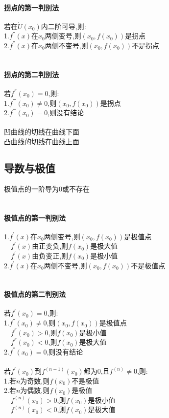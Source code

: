\documentclass{article}
\begin{document}
\begin{flushleft}
	\paragraph{拐点的第一判别法}
	若在$\mathring{U}(x_0)$内二阶可导,则:\\
	1.$f^{''}(x)$在$x_0$两侧变号,则$(x_0,f(x_0))$是拐点\\
	2.$f^{''}(x)$在$x_0$两侧不变号,则$(x_0,f(x_0))$不是拐点\\
	~\\
	\paragraph{拐点的第二判别法}
	若$f^{''}(x_0)=0$,则:\\
	1.$f^{'''}(x_0)\neq 0$,则$(x_0,f(x_0))$是拐点\\
	2.$f^{'''}(x_0)=0$,则没有结论\\
	~\\
	凹曲线的切线在曲线下面\\
	凸曲线的切线在曲线上面\\
	
	\subsection{导数与极值}
	
	极值点的一阶导为0或不存在\\
	~\\
	\paragraph{极值点的第一判别法}
	1.$f^{'}(x)$在$x_0$两侧变号,则$(x_0,f(x_0))$是极值点\\
	\ \ $f^{'}(x)$由正变负,则$f(x_0)$是极大值\\
	\ \ $f^{'}(x)$由负变正,则$f(x_0)$是极小值\\
	2.$f^{'}(x)$在$x_0$两侧不变号,则$(x_0,f(x_0))$不是极值点\\
	~\\
	\paragraph{极值点的第二判别法}
	若$f^{'}(x_0)=0$,则:\\
	1.$f^{''}(x_0)\neq 0$,则$(x_0,f(x_0))$是极值点\\
	\ \ $f^{''}(x_0)>0$,则$f(x_0)$是极小值\\
	\ \ $f^{''}(x_0)<0$,则$f(x_0)$是极大值\\
	2.$f^{''}(x_0)=0$,则没有结论\\
	~\\
	若$f^{'}(x_0)$到$f^{(n-1)}(x_0)$都为0,且$f^{(n)}\neq 0$,则:\\
	1.若$n$为奇数,则$f(x_0)$不是极值\\
	2.若$n$为偶数,则$f(x_0)$是极值\\
	\ \ $f^{(n)}(x_0)>0$,则$f(x_0)$是极小值\\
	\ \ $f^{(n)}(x_0)<0$,则$f(x_0)$是极大值\\
	

\end{flushleft}
\end{document}
